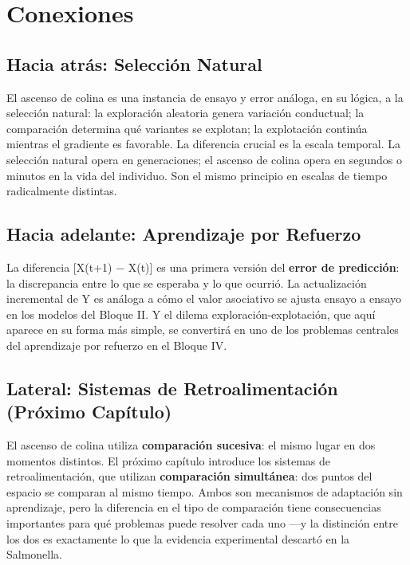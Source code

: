 \documentclass[
  letterpaper,
  DIV=11,
  numbers=noendperiod]{scrreprt}
\begin{document}
\section{Conexiones}\label{conexiones}

\subsection{Hacia atrás: Selección
Natural}\label{hacia-atruxe1s-selecciuxf3n-natural}

El ascenso de colina es una instancia de ensayo y error análoga, en su
lógica, a la selección natural: la exploración aleatoria genera
variación conductual; la comparación determina qué variantes se
explotan; la explotación continúa mientras el gradiente es favorable. La
diferencia crucial es la escala temporal. La selección natural opera en
generaciones; el ascenso de colina opera en segundos o minutos en la
vida del individuo. Son el mismo principio en escalas de tiempo
radicalmente distintas.

\subsection{Hacia adelante: Aprendizaje por
Refuerzo}\label{hacia-adelante-aprendizaje-por-refuerzo}

La diferencia {[}X(t+1) − X(t){]} es una primera versión del
\textbf{error de predicción}: la discrepancia entre lo que se esperaba y
lo que ocurrió. La actualización incremental de Y es análoga a cómo el
valor asociativo se ajusta ensayo a ensayo en los modelos del Bloque II.
Y el dilema exploración-explotación, que aquí aparece en su forma más
simple, se convertirá en uno de los problemas centrales del aprendizaje
por refuerzo en el Bloque IV.

\subsection{Lateral: Sistemas de Retroalimentación (Próximo
Capítulo)}\label{lateral-sistemas-de-retroalimentaciuxf3n-pruxf3ximo-capuxedtulo}

El ascenso de colina utiliza \textbf{comparación sucesiva}: el mismo
lugar en dos momentos distintos. El próximo capítulo introduce los
sistemas de retroalimentación, que utilizan \textbf{comparación
simultánea}: dos puntos del espacio se comparan al mismo tiempo. Ambos
son mecanismos de adaptación sin aprendizaje, pero la diferencia en el
tipo de comparación tiene consecuencias importantes para qué problemas
puede resolver cada uno ---y la distinción entre los dos es exactamente
lo que la evidencia experimental descartó en la Salmonella.
\end{document}

